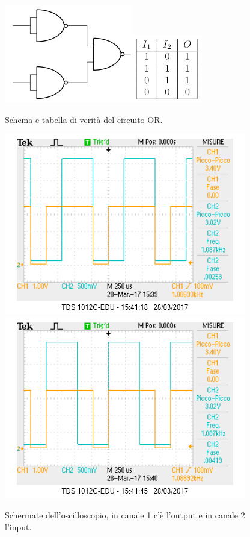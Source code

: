 \documentclass[10pt,a4paper]{article}
\begin{document}
\begin{figure}[!htb]
  \centering
  \includegraphics[scale=0.9]{or.png}\includegraphics[scale=0.9]{tabOR.png}
\caption{Schema e tabella di verità del circuito OR.\label{fig:OR}}
\end{figure}

\begin{figure}[!htb]
  \centering
  \includegraphics[scale=0.75]{or1.png}\includegraphics[scale=0.75]{or2.png}
\caption{Schermate dell'oscilloscopio, in canale 1 c'è l'output e in canale 2 l'input.\label{osc:OR}}
\end{figure}
\end{document}
